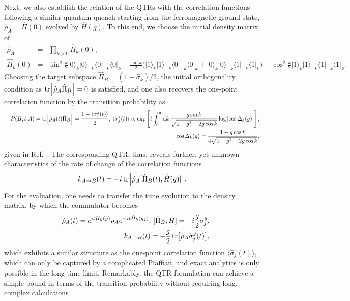 \documentclass[prl,aps,amssymb,twocolumn,superscriptaddress, notitlepage, longbibliography]{revtex4-2}
\begin{document}
Next, we also establish the relation of the QTRs with the correlation functions following a similar quantum quench starting from the ferromagnetic ground state, $\hat\rho_A=\hat\Pi(0)$ evolved by $\hat H(g)$. To this end, we choose the initial density matrix of
\begin{eqnarray}
    \hat\rho_A&=&\prod_{k>0}\hat\Pi_k(0),\\
    \hat\Pi_k(0)&=&\sin^2\frac{k}{2}\lvert0\rangle_k\lvert0\rangle_{-k}\langle0\rvert_{-k}\langle0\rvert_k-\frac{\sin k}{2}\Big(\lvert1\rangle_k\lvert1\rangle_{-k}\langle0\rvert_{-k}\langle0\rvert_k+\lvert0\rangle_k\lvert0\rangle_{-k}\langle1\rvert_{-k}\langle1\rvert_k\Big)+\cos^2\frac{k}{2}\lvert1\rangle_k\lvert1\rangle_{-k}\langle1\rvert_{-k}\langle1\rvert_k.\qquad
\end{eqnarray}
Choosing the target subspace $\hat\Pi_B=(1-\hat\sigma^z_k)/2$, the initial orthogonality condition as $\tr[\hat\rho_A\hat\Pi_B]=0$ is satisfied, and one also recovers the one-point correlation function by the transition probability as
\begin{eqnarray}
    &&P(B,t\vert A)=\tr[\hat\rho_A(t)\hat\Pi_B]=\frac{1-\langle\sigma^z_j(t)\rangle}{2},\,\langle\sigma^z_j(t)\rangle\propto\exp\left[t\int_0^\pi\mathrm dk\,\frac{g\sin k}{\sqrt{1+g^2-2g\cos k}}\log\left[\cos \Delta_k(g)\right]\right],\\
    &&\cos \Delta_k(g)=\frac{1-g\cos k}{4\sqrt{1+g^2-2g\cos k}},\nonumber
\end{eqnarray}
given in Ref.~\cite{Calabrese_PRL2011, Calabrese_2012Review, Calabrese_2012_Review2}.
The corresponding QTR, thus, reveals further, yet unknown characteristics of the rate of change of the correlation functions
\begin{eqnarray}
    k_{A\rightarrow B}(t)=-i\tr[\hat\rho_A[\hat\Pi_B(t),\hat H(g)]].
\end{eqnarray}
For the evaluation, one needs to transfer the time evolution to the density matrix, by which the commutator becomes
\begin{eqnarray}
    &&\hat\rho_A(t)=e^{it\hat H_k(g)}\rho_A e^{-it\hat H_k(g_2)},\,[\hat\Pi_B,\hat H]=-i\frac{g}{2}\sigma^y_j,\\
    &&k_{A\rightarrow B}(t)=-\frac{g}{2}\tr[\hat\rho_A\hat\sigma^y_j(t)],
\end{eqnarray}
which exhibits a similar structure as the one-point correlation function $\langle\hat\sigma^z_j(t)\rangle$, which can only be captured by a complicated Pfaffian, and exact analytics is only possible in the long-time limit. Remarkably, the QTR formulation can achieve a simple bound in terms of the transition probability without requiring long, complex calculations
\end{document}
